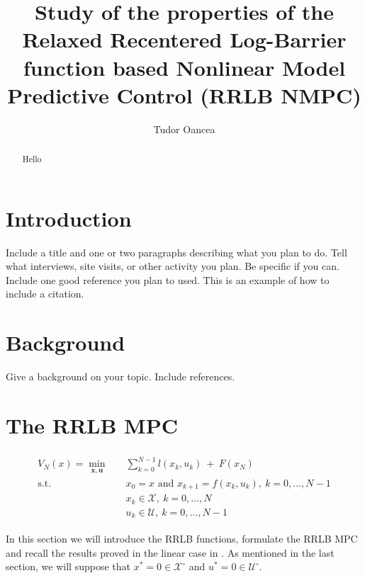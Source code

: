 \documentclass[journal]{IEEEtran}
\theoremstyle{definition}
\theoremstyle{remark}
\def\cal#1{\mathcal{#1}}
\def\bf#1{\mathbf{#1}}
\begin{document}
\title{Study of the properties of the Relaxed Recentered Log-Barrier function based Nonlinear Model Predictive Control (RRLB NMPC)}

\author{Tudor Oancea}%
        

\maketitle

\begin{abstract}
    Hello
\end{abstract}

\section{Introduction}
Include a title and one or two paragraphs describing what you plan to do.
Tell what interviews, site visits, or other activity you plan.
Be specific if you can.
Include  one good reference you plan to used. This is an example of how to include a citation.

\section{Background}
Give a background on your topic. Include references. 

\section{The RRLB MPC}\label{sec:RRLB-MPC}
\begin{align}
	\begin{split}
		\label{eq:NMPC}
		V_N(x)=\underset{\bf{x},\bf{u}}{\min} &\quad \sum_{k=0}^{N-1}l(x_k,u_k)~+~F(x_N)\\
		\text{s.t.} &\quad x_0=x\text{ and }x_{k+1}=f(x_k,u_k),~k=0,\ldots,N-1\\
		&\quad x_k\in\cal{X},~k=0,\ldots,N\\
		&\quad u_k\in\cal{U},~k=0,\ldots,N-1
	\end{split}
\end{align}

In this section we will introduce the RRLB functions, formulate the RRLB MPC and recall the results proved in the linear case in \cite{RRLB-linear-MPC}.
As mentioned in the last section, we will suppose that $x^*=0\in\cal{X}^\circ$ and $u^*=0\in\cal{U}^\circ$.
\end{document}
